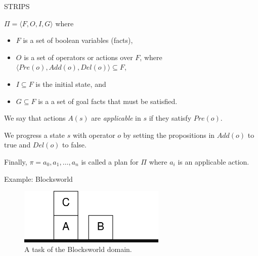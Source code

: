 \documentclass{beamer}
\begin{document}
\begin{frame}{STRIPS}
  \begin{definition}
    $\Pi = \langle F, O, I, G\rangle$ where
    \begin{itemize}
        \item $F$ is a set of boolean variables (\alert{facts}),
        \item $O$ is a set of \alert{operators} or actions over $F$, where $\langle Pre(o), Add(o), Del(o) \rangle \subseteq F$,
        \item $I \subseteq F$ is the \alert{initial state}, and
        \item $G \subseteq F$ is a a set of \alert{goal facts} that must be satisfied.
    \end{itemize}
   \pause
    We say that actions $A(s)$ are \emph{applicable} in $s$ if they satisfy $Pre(o)$.

    We progress a state $s$ with operator $o$ by setting the propositions in $Add(o)$ to true and $Del(o)$ to false.
    \pause

    Finally, $\pi = a_{0}, a_{1},\ldots, a_{n}$ is called a \alert{plan} for $\Pi$ where $a_{i}$ is an applicable action.
\end{definition}
\end{frame}

\begin{frame}{Example: Blocksworld} 
\begin{figure}
    \centering
    \includegraphics[width=7cm]{img/blocksworld1.png}
    \caption{A task of the Blocksworld domain.}
\end{figure}
\end{frame}
\end{document}
